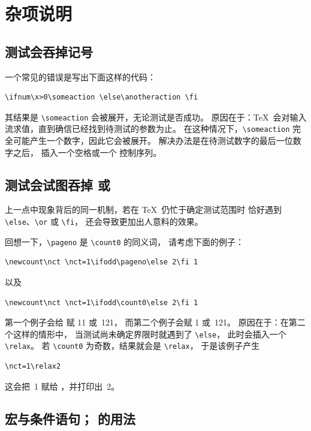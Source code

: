 \documentclass[a4paper]{rapport3}
\begin{document}
\section{杂项说明}

\subsection{测试会吞掉记号}

一个常见的错误是写出下面这样的代码：
\begin{verbatim}
\ifnum\x>0\someaction \else\anotheraction \fi
\end{verbatim}
其结果是 \verb.\someaction. 会被展开，无论测试是否成功。
原因在于：\TeX\ 会对输入流求值，直到确信已经找到待测试的参数为止。
在这种情况下，\verb.\someaction. 完全可能产生一个数字，因此它会被展开。
解决办法是在待测试数字的最后一位数字之后，
\altt
插入一个空格或一个  控制序列。

\subsection{测试会试图吞掉  或 }

上一点中现象背后的同一机制，若在 \TeX\ 仍忙于确定测试范围时
恰好遇到 \verb.\else.、\verb.\or. 或 \verb.\fi.，
还会导致更加出人意料的效果。

回想一下，\verb.\pageno. 是 \verb.\count0. 的同义词，
请考虑下面的例子：
\begin{verbatim}
\newcount\nct \nct=1\ifodd\pageno\else 2\fi 1
\end{verbatim}
以及
\begin{verbatim}
\newcount\nct \nct=1\ifodd\count0\else 2\fi 1
\end{verbatim}
第一个例子会给  赋 11 或~121，
而第二个例子会赋 1 或~121。
原因在于：在第二个这样的情形中，
当测试尚未确定界限时就遇到了 \verb.\else.，
\altt
此时会插入一个 \verb.\relax.。
若 \verb.\count0. 为奇数，结果就会是 \verb.\relax.，
于是该例子产生 \begin{verbatim}
\nct=1\relax2
\end{verbatim}
这会把~1 赋给 ，并打印出~2。


\subsection{宏与条件语句； 的用法}
\label{after:cond}
\end{document}

